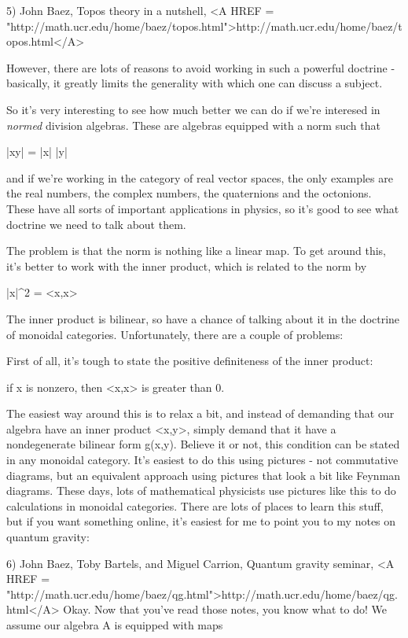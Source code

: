 5) John Baez, Topos theory in a nutshell,
<A HREF = "http://math.ucr.edu/home/baez/topos.html">http://math.ucr.edu/home/baez/topos.html</A>

However, there are lots of reasons to avoid working in such a powerful
doctrine - basically, it greatly limits the generality with which one
can discuss a subject.  

So it's very interesting to see how much better we can do if we're
interesed in \emph{normed} division algebras.  These are algebras equipped
with a norm such that

|xy| = |x| |y|

and if we're working in the category of real vector spaces, the only
examples are the real numbers, the complex numbers, the quaternions
and the octonions.  These have all sorts of important applications in
physics, so it's good to see what doctrine we need to talk about them.

The problem is that the norm is nothing like a linear map.  To get
around this, it's better to work with the inner product, which is
related to the norm by

|x|^{2} = <x,x>  

The inner product is bilinear, so have a chance of talking about it in
the doctrine of monoidal categories.  Unfortunately, there are a couple
of problems:

First of all, it's tough to state the positive definiteness of the inner
product:

if x is nonzero, then <x,x> is greater than 0.

The easiest way around this is to relax a bit, and instead of demanding
that our algebra have an inner product <x,y>, simply demand that it have
a nondegenerate bilinear form g(x,y).  Believe it or not, this condition
can be stated in any monoidal category.  It's easiest to do this using
pictures - not commutative diagrams, but an equivalent approach using
pictures that look a bit like Feynman diagrams.  These days, lots of
mathematical physicists use pictures like this to do calculations in
monoidal categories.  There are lots of places to learn this stuff, but
if you want something online, it's easiest for me to point you to my notes
on quantum gravity:

6) John Baez, Toby Bartels, and Miguel Carrion, Quantum gravity 
seminar, <A HREF = "http://math.ucr.edu/home/baez/qg.html">http://math.ucr.edu/home/baez/qg.html</A>
Okay.  Now that you've read those notes, you know what to do!
We assume our algebra A is equipped with maps 

